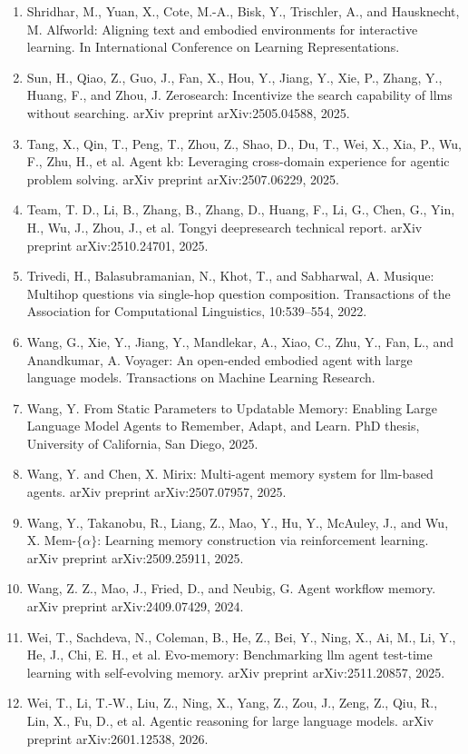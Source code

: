 \documentclass[11pt,UTF8,fontset=fandol]{ctexart}
\begin{document}
\begin{enumerate}[leftmargin=2em,itemsep=0.15em]
\item Shridhar, M., Yuan, X., Cote, M.-A., Bisk, Y., Trischler, A., and Hausknecht, M. Alfworld: Aligning text and embodied environments for interactive learning. In International Conference on Learning Representations.
\item Sun, H., Qiao, Z., Guo, J., Fan, X., Hou, Y., Jiang, Y., Xie, P., Zhang, Y., Huang, F., and Zhou, J. Zerosearch: Incentivize the search capability of llms without searching. arXiv preprint arXiv:2505.04588, 2025.
\item Tang, X., Qin, T., Peng, T., Zhou, Z., Shao, D., Du, T., Wei, X., Xia, P., Wu, F., Zhu, H., et al. Agent kb: Leveraging cross-domain experience for agentic problem solving. arXiv preprint arXiv:2507.06229, 2025.
\item Team, T. D., Li, B., Zhang, B., Zhang, D., Huang, F., Li, G., Chen, G., Yin, H., Wu, J., Zhou, J., et al. Tongyi deepresearch technical report. arXiv preprint arXiv:2510.24701, 2025.
\item Trivedi, H., Balasubramanian, N., Khot, T., and Sabharwal, A. Musique: Multihop questions via single-hop question composition. Transactions of the Association for Computational Linguistics, 10:539--554, 2022.
\item Wang, G., Xie, Y., Jiang, Y., Mandlekar, A., Xiao, C., Zhu, Y., Fan, L., and Anandkumar, A. Voyager: An open-ended embodied agent with large language models. Transactions on Machine Learning Research.
\item Wang, Y. From Static Parameters to Updatable Memory: Enabling Large Language Model Agents to Remember, Adapt, and Learn. PhD thesis, University of California, San Diego, 2025.
\item Wang, Y. and Chen, X. Mirix: Multi-agent memory system for llm-based agents. arXiv preprint arXiv:2507.07957, 2025.
\item Wang, Y., Takanobu, R., Liang, Z., Mao, Y., Hu, Y., McAuley, J., and Wu, X. Mem-$\{\alpha\}$: Learning memory construction via reinforcement learning. arXiv preprint arXiv:2509.25911, 2025.
\item Wang, Z. Z., Mao, J., Fried, D., and Neubig, G. Agent workflow memory. arXiv preprint arXiv:2409.07429, 2024.
\item Wei, T., Sachdeva, N., Coleman, B., He, Z., Bei, Y., Ning, X., Ai, M., Li, Y., He, J., Chi, E. H., et al. Evo-memory: Benchmarking llm agent test-time learning with self-evolving memory. arXiv preprint arXiv:2511.20857, 2025.
\item Wei, T., Li, T.-W., Liu, Z., Ning, X., Yang, Z., Zou, J., Zeng, Z., Qiu, R., Lin, X., Fu, D., et al. Agentic reasoning for large language models. arXiv preprint arXiv:2601.12538, 2026.

\end{enumerate}
\end{document}
